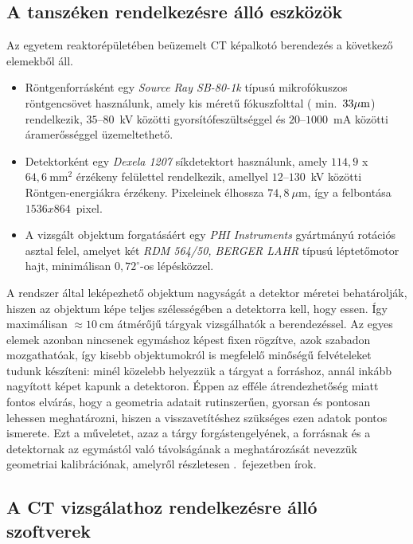 \documentclass[a4paper,12pt]{article}
\begin{document}
\subsection{A tanszéken rendelkezésre álló eszközök}

Az egyetem reaktorépületében beüzemelt CT képalkotó berendezés a következő elemekből áll. 
\begin{itemize}
\item Röntgenforrásként egy \emph{Source Ray SB-80-1k}  típusú mikrofókuszos röntgencsövet használunk, amely kis méretű fókuszfolttal ( min.\ $33\mu \text m$) rendelkezik, $35$--$80$~kV közötti gyorsítófeszültséggel és $20$--$1000$~mA közötti áramerősséggel üzemeltethető.  
\item Detektorként egy \emph{Dexela 1207}  síkdetektort használunk, amely $114,\!9$ x $64,\!6~\text{mm}^2$ érzékeny felülettel rendelkezik, amellyel $12$--$130$~kV közötti Röntgen-energiákra érzékeny. Pixeleinek élhossza $74,\!8~\mu\text{m}$, így a felbontása $1536 x 864$~pixel.  
\item A vizsgált objektum forgatásáért egy \emph{PHI Instruments} gyártmányú rotációs asztal felel, amelyet két \emph{RDM 564/50, BERGER LAHR} típusú léptetőmotor hajt, minimálisan  $0,\!72^\circ$-os lépésközzel.
\end{itemize}


A rendszer által leképezhető objektum nagyságát a detektor méretei behatárolják, hiszen az objektum képe teljes szélességében a detektorra kell, hogy essen. Így maximálisan $\approx10~\text{cm}$ átmérőjű tárgyak vizsgálhatók a berendezéssel. Az egyes elemek azonban nincsenek egymáshoz képest fixen rögzítve, azok szabadon mozgathatóak, így kisebb objektumokról is megfelelő minőségű felvételeket tudunk készíteni: minél közelebb helyezzük a tárgyat a forráshoz, annál inkább nagyított képet kapunk a detektoron. Éppen az efféle átrendezhetőség miatt fontos elvárás, hogy a geometria adatait rutinszerűen, gyorsan és pontosan lehessen meghatározni, hiszen a visszavetítéshez szükséges ezen adatok pontos ismerete. Ezt a műveletet, azaz a tárgy forgástengelyének, a forrásnak és a detektornak az egymástól való távolságának a meghatározását nevezzük geometriai kalibrációnak, amelyről részletesen .~fejezetben írok.

\subsection{A CT vizsgálathoz rendelkezésre álló szoftverek}
\end{document}
